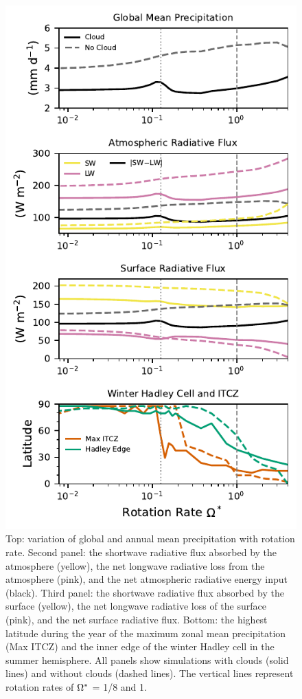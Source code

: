 \begin{figure}[htb]
    \centering
    \includegraphics[width=\columnwidth]{plots/6-ITCZ-rot-2.pdf}
    \caption{Top: variation of global and annual mean precipitation with rotation rate. Second panel: the shortwave radiative flux absorbed by the atmosphere (yellow), the net longwave radiative loss from the atmosphere (pink), and the net atmospheric radiative energy input (black). Third panel: the shortwave radiative flux absorbed by the surface (yellow), the net longwave radiative loss of the surface (pink), and the net surface radiative flux. Bottom: the highest latitude during the year of the maximum zonal mean precipitation (Max ITCZ) and the inner edge of the winter Hadley cell in the summer hemisphere. All panels show simulations with clouds (solid lines) and without clouds (dashed lines). The vertical lines represent rotation rates of $\Omega^*$ = 1/8 and 1.}
    \label{fig:lat-rotation}
\end{figure}


